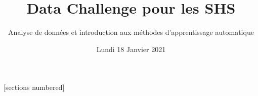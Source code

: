 \documentclass[10pt]{beamer}
\title{\large Data Challenge pour les SHS}
\subtitle{\small Analyse de données et introduction aux méthodes d'apprentissage automatique}
\date{Lundi 18 Janvier 2021}
\newcommand{\blue}[1]{\textcolor{blue}{#1}}
\begin{document}


  [sections numbered]

\frame{\titlepage
}

%
%
%
%
%
%

\end{document}
